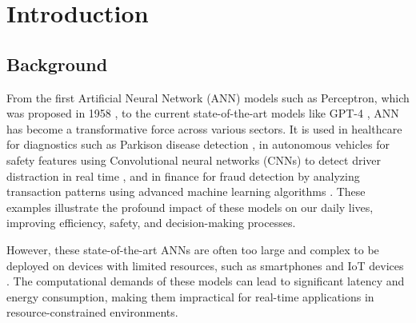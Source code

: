 \begin{comment}
    

    Nessa paper vamos focar na verificação de redes Redes Neurais Convulacionais Quantizadas (QCNNs) lidando como o problema da equivalência de código entre a função original e a função quantizadas.

    O objetivo do paper é mostrar que o método de verificação BMC com SMT pode ser usado para garantir a confiabilidade de QCNNs no processamento de imagens em sistemas de menor potência computacional.
    
    Existem trabalhos que usam SMT para verificar o modelo matemático, mas como mostrado por \cite{cordeiro2025neuralnetworkverificationprogramming} ele deve ser tratado como um programa de verificação de programa.

    Verificar no BMC
    --multi-property
    --parallel-solving
    --smt-symex-guard


\end{comment}


\chapter{Introduction}\label{cap:intro}


\section{Background}\label{sec:background}
From the first Artificial Neural Network (ANN) models such as Perceptron, which was proposed in 1958 \cite{Rosenblatt1958}, to the current state-of-the-art models like GPT-4 \cite{OpenAI2023GPT4}, ANN has become a transformative force across various sectors. It is used in healthcare for diagnostics such as Parkison disease detection \cite{Luo2025Efficient}, in autonomous vehicles for safety features using Convolutional neural networks (CNNs) to detect driver distraction in real time \cite{Lei2025An}, and in finance for fraud detection by analyzing transaction patterns using advanced machine learning algorithms \cite{Zhu2024A}. These examples illustrate the profound impact of these models on our daily lives, improving efficiency, safety, and decision-making processes. 

However, these state-of-the-art ANNs are often too large and complex to be deployed on devices with limited resources, such as smartphones and IoT devices \cite{Zhu2020Survey}. The computational demands of these models can lead to significant latency and energy consumption, making them impractical for real-time applications in resource-constrained environments.


